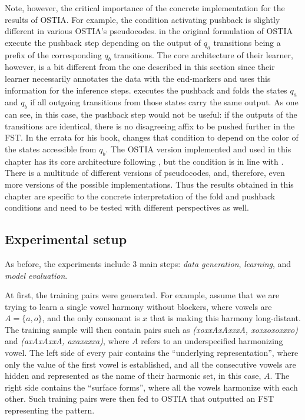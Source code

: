 Note, however, the critical importance of the concrete implementation for the results of OSTIA.
For example, the condition activating pushback is slightly different in various OSTIA's pseudocodes.
\cite{OncinaEtAl1993} in the original formulation of OSTIA execute the pushback step depending on the output of $q_a$ transitions being a prefix of the corresponding $q_b$ transitions.
The core architecture of their learner, however, is a bit different from the one described in this section since their learner necessarily annotates the data with the end-markers and uses this information for the inference steps.
\cite{DeLaHiguera2010} executes the pushback and folds the states $q_a$ and $q_b$ if all outgoing transitions from those states carry the same output.
As one can see, in this case, the pushback step would not be useful: if the outputs of the transitions are identical, there is no disagreeing affix to be pushed further in the FST.
In the errata for his book, \cite{DeLaHiguera2011} changes that condition to depend on the color of the states accessible from $q_b$.
The OSTIA version implemented and used in this chapter has its core architecture following \cite{DeLaHiguera2010}, but the condition is in line with \cite{OncinaEtAl1993}.
There is a multitude of different versions of pseudocodes, and, therefore, even more versions of the possible implementations.
Thus the results obtained in this chapter are specific to the concrete interpretation of the fold and pushback conditions and need to be tested with different perspectives as well.


\subsection{Experimental setup}

As before, the experiments include $3$ main steps: \emph{data generation}, \emph{learning}, and \emph{model evaluation}.

At first, the training pairs were generated.
For example, assume that we are trying to learn a single vowel harmony without blockers, where vowels are $A = \{a, o\}$, and the only consonant is $x$ that is making this harmony long-distant.
The training sample will then contain pairs such as \emph{(xoxxAxAxxxA, xoxxoxoxxxo)} and \emph{(axAxAxxA, axaxaxxa)}, where $A$ refers to an underspecified harmonizing vowel.
The left side of every pair contains the ``underlying representation'', where only the value of the first vowel is established, and all the consecutive vowels are hidden and represented as the name of their harmonic set, in this case, $A$.
The right side contains the ``surface forms'', where all the vowels harmonize with each other.
Such training pairs were then fed to OSTIA that outputted an FST representing the pattern. 

